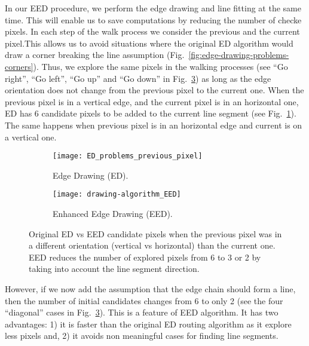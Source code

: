 \documentclass[preprint,12pt]{elsarticle}
\begin{document}
In our EED procedure, we perform the edge drawing and line fitting at the same time. This will enable us to save computations by reducing the number of checke pixels. In each step of the walk process we consider the previous and the current pixel.This allows us to avoid situations where the original ED algorithm would draw a corner breaking the line assumption (Fig.~\ref{fig:edge-drawing-problems-corners}). 
Thus, we explore the same pixels in the walking processes (see ``Go right'', ``Go left'', ``Go up'' and  ``Go down'' in Fig.~\ref{fig:enhanced-edge-drawing}) as long as the edge orientation does not change from the previous pixel to the current one. When the previous pixel is in a vertical edge, and the current pixel is in an horizontal one, ED has 6 candidate pixels to be added to the current line segment (see Fig.~\ref{fig:edge-drawing-problems-previous-pixel}). 
The same happens when previous pixel is in an horizontal edge and current is on a vertical one.
\begin{figure}
    \centering
    \begin{subfigure}{1.00\textwidth}
        \centering
        \texttt{[image: ED\_problems\_previous\_pixel]}
        \caption{Edge Drawing (ED).
        }
        \label{fig:edge-drawing-problems-previous-pixel}
    \end{subfigure}
    \begin{subfigure}{1.00\textwidth}
        \centering
        \texttt{[image: drawing-algorithm\_EED]}
        \caption{Enhanced Edge Drawing (EED). 
        }
        \label{fig:enhanced-edge-drawing}
    \end{subfigure}
    \caption{Original ED vs EED candidate pixels when the previous pixel was in a different orientation (vertical vs horizontal) than the current one. EED reduces the number of explored pixels from 6 to 3 or 2 by taking into account the line segment direction.
    }
    \end{figure}
However, if we now add the assumption that the edge chain should form a line, then the number of initial candidates changes from 6 to only 2 (see the four ``diagonal'' cases in Fig.~\ref{fig:enhanced-edge-drawing}). This is a feature of EED algorithm.
It has two advantages: 1) it is faster than the original ED routing algorithm as it explore less pixels and, 2) it avoids non meaningful cases for finding line segments. 
\end{document}
